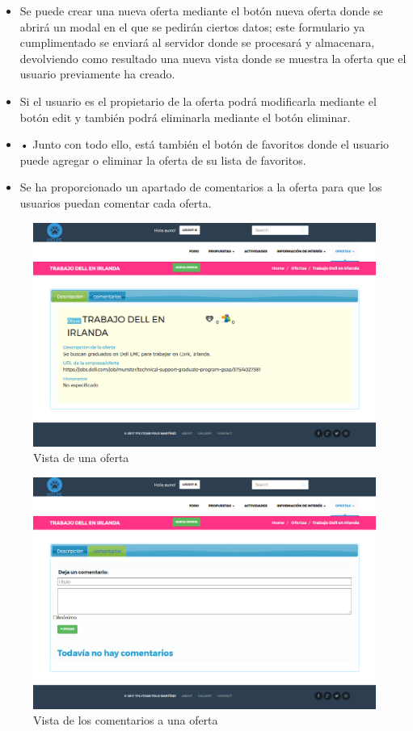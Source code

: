 \begin{itemize}
\item Se puede crear una nueva oferta mediante el botón nueva oferta donde se abrirá un modal en el que se pedirán ciertos datos; este formulario ya cumplimentado se enviará al servidor donde se procesará y almacenara, devolviendo como resultado una nueva vista donde se muestra la oferta que el usuario previamente ha creado.
\item Si el usuario es el propietario de la oferta podrá modificarla mediante el botón edit y también podrá eliminarla mediante el botón eliminar.
\item •	Junto con todo ello, está también el botón de favoritos donde el usuario puede agregar o eliminar la oferta de su lista de favoritos.  
\item Se ha proporcionado un apartado de comentarios a la oferta para que los usuarios puedan comentar cada oferta.
\end{itemize}


\begin{figure}[H]
   \centering
   \includegraphics[width=12cm]{img/oferta}
   \caption{Vista de una oferta}
   \label{figura:oferta}
\end{figure}
\begin{figure}[H]
   \centering
   \includegraphics[width=12cm]{img/oferta_comment}
   \caption{Vista de los comentarios a una oferta}
   \label{figura:oferta_comment}
\end{figure}


